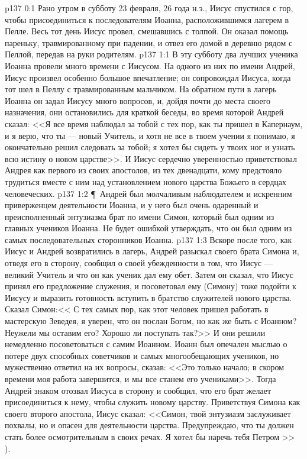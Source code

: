 \vs p137 0:1 Рано утром в субботу 23 февраля, 26 года н.э., Иисус спустился с гор, чтобы присоединиться к последователям Иоанна, расположившимся лагерем в Пелле. Весь тот день Иисус провел, смешавшись с толпой. Он оказал помощь пареньку, травмированному при падении, и отвез его домой в деревню рядом с Пеллой, передав на руки родителям.
\vs p137 1:1 В эту субботу два лучших ученика Иоанна провели много времени с Иисусом. На одного из них по имени Андрей, Иисус произвел особенно большое впечатление; он сопровождал Иисуса, когда тот шел в Пеллу с травмированным мальчиком. На обратном пути в лагерь Иоанна он задал Иисусу много вопросов, и, дойдя почти до места своего назначения, они остановились для краткой беседы, во время которой Андрей сказал: <<Я все время наблюдал за тобой с тех пор, как ты пришел в Капернаум, и я верю, что ты --- новый Учитель, и хотя не все в твоем учении я понимаю, я окончательно решил следовать за тобой; я хотел бы сидеть у твоих ног и узнать всю истину о новом царстве>>. И Иисус сердечно уверенностью приветствовал Андрея как первого из своих апостолов, из тех двенадцати, кому предстояло трудиться вместе с ним над установлением нового царства Божьего в сердцах человеческих.
\vs p137 1:2 \P\ Андрей был молчаливым наблюдателем и искренним приверженцем деятельности Иоанна, и у него был очень одаренный и преисполненный энтузиазма брат по имени Симон, который был одним из главных учеников Иоанна. Не будет ошибкой утверждать, что он был одним из самых последовательных сторонников Иоанна.
\vs p137 1:3 Вскоре после того, как Иисус и Андрей возвратились в лагерь, Андрей разыскал своего брата Симона и, отведя его в сторону, сообщил о своей убежденности в том, что Иисус --- великий Учитель и что он как ученик дал ему обет. Затем он сказал, что Иисус принял его предложение служения, и посоветовал ему (Симону) тоже подойти к Иисусу и выразить готовность вступить в братство служителей нового царства. Сказал Симон:<< С тех самых пор, как этот человек пришел работать в мастерскую Зеведея, я уверен, что он послан Богом, но как же быть с Иоанном? Неужели мы оставим его? Хорошо ли поступать так?>> И они решили немедленно посоветоваться с самим Иоанном. Иоанн был опечален мыслью о потере двух способных советчиков и самых многообещающих учеников, но мужественно ответил на их вопросы, сказав: <<Это только начало; в скором времени моя работа завершится, и мы все станем его учениками>>. Тогда Андрей знаком отозвал Иисуса в сторону и сообщил, что его брат желает присоединиться к нему, чтобы служить новому царству. Приветствуя Симона как своего второго апостола, Иисус сказал: <<Симон, твой энтузиазм заслуживает похвалы, но и опасен для деятельности царства. Предупреждаю, что ты должен стать более осмотрительным в своих речах. Я хотел бы наречь тебя Петром >> ).
